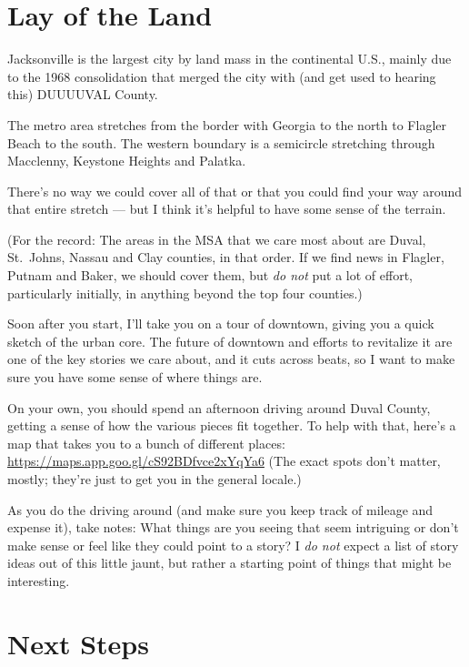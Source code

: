 \documentclass[
  12pt,
  american,
  letterpaperpaper,
  extrafontsizes,onecolumn,openright
  ]{memoir}
\begin{document}
\hypertarget{lay-of-the-land}{%
\section*{Lay of the Land}\label{lay-of-the-land}}

Jacksonville is the largest city by land mass in the continental U.S., mainly due to the 1968 consolidation that merged the city with (and get used to hearing this) DUUUUVAL County.

The metro area stretches from the border with Georgia to the north to Flagler Beach to the south. The western boundary is a semicircle stretching through Macclenny, Keystone Heights and Palatka.

There's no way we could cover all of that or that you could find your way around that entire stretch --- but I think it's helpful to have some sense of the terrain.

(For the record: The areas in the MSA that we care most about are Duval, St.~Johns, Nassau and Clay counties, in that order. If we find news in Flagler, Putnam and Baker, we should cover them, but \emph{do not} put a lot of effort, particularly initially, in anything beyond the top four counties.)

Soon after you start, I'll take you on a tour of downtown, giving you a quick sketch of the urban core. The future of downtown and efforts to revitalize it are one of the key stories we care about, and it cuts across beats, so I want to make sure you have some sense of where things are.

On your own, you should spend an afternoon driving around Duval County, getting a sense of how the various pieces fit together. To help with that, here's a map that takes you to a bunch of different places: \url{https://maps.app.goo.gl/cS92BDfvce2xYqYa6} (The exact spots don't matter, mostly; they're just to get you in the general locale.)

As you do the driving around (and make sure you keep track of mileage and expense it), take notes: What things are you seeing that seem intriguing or don't make sense or feel like they could point to a story? I \emph{do not} expect a list of story ideas out of this little jaunt, but rather a starting point of things that might be interesting.

\hypertarget{next-steps}{%
\section*{Next Steps}\label{next-steps}}
\end{document}
